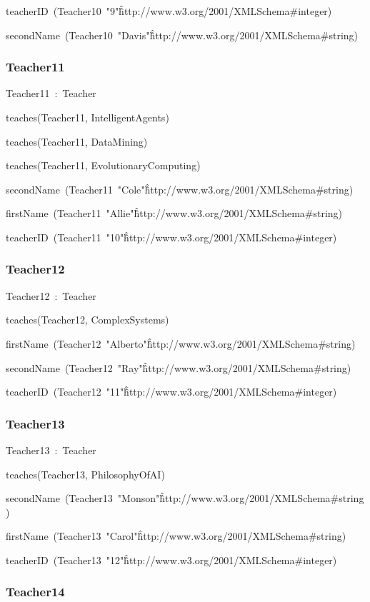 \documentclass{article}
\begin{document}
teacherID~(Teacher10~"9"\^\^http://www.w3.org/2001/XMLSchema#integer)

secondName~(Teacher10~"Davis"\^\^http://www.w3.org/2001/XMLSchema#string)

\subsubsection*{Teacher11}

Teacher11~:~Teacher

teaches(Teacher11, IntelligentAgents)

teaches(Teacher11, DataMining)

teaches(Teacher11, EvolutionaryComputing)

secondName~(Teacher11~"Cole"\^\^http://www.w3.org/2001/XMLSchema#string)

firstName~(Teacher11~"Allie"\^\^http://www.w3.org/2001/XMLSchema#string)

teacherID~(Teacher11~"10"\^\^http://www.w3.org/2001/XMLSchema#integer)

\subsubsection*{Teacher12}

Teacher12~:~Teacher

teaches(Teacher12, ComplexSystems)

firstName~(Teacher12~"Alberto"\^\^http://www.w3.org/2001/XMLSchema#string)

secondName~(Teacher12~"Ray"\^\^http://www.w3.org/2001/XMLSchema#string)

teacherID~(Teacher12~"11"\^\^http://www.w3.org/2001/XMLSchema#integer)

\subsubsection*{Teacher13}

Teacher13~:~Teacher

teaches(Teacher13, PhilosophyOfAI)

secondName~(Teacher13~"Monson"\^\^http://www.w3.org/2001/XMLSchema#string)

firstName~(Teacher13~"Carol"\^\^http://www.w3.org/2001/XMLSchema#string)

teacherID~(Teacher13~"12"\^\^http://www.w3.org/2001/XMLSchema#integer)

\subsubsection*{Teacher14}
\end{document}
